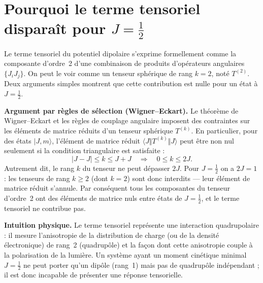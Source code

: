 \chapter[Moment tensoriel pour J=1/2]{Pourquoi le terme tensoriel disparaît pour $J=\tfrac12$}

\label{annex:no_tensor}

Le terme tensoriel du potentiel dipolaire s'exprime formellement comme la composante d'ordre~2 d'une combinaison de produits d'opérateurs angulaires \(\{J_iJ_j\}\). On peut le voir comme un tenseur sphérique de rang \(k=2\), noté \(T^{(2)}\). Deux arguments simples montrent que cette contribution est nulle pour un état à \(J=\tfrac12\).

\medskip

\noindent\textbf{Argument par règles de sélection (Wigner–Eckart).}
Le théorème de Wigner–Eckart et les règles de couplage angulaire imposent des contraintes sur les éléments de matrice réduits d'un tenseur sphérique \(T^{(k)}\). En particulier, pour des états \(|J,m\rangle\), l'élément de matrice réduit \(\langle J\Vert T^{(k)}\Vert J\rangle\) peut être non nul seulement si la condition triangulaire est satisfaite :
\[
|J-J|\le k \le J+J \quad\Longrightarrow\quad 0\le k\le 2J.
\]
Autrement dit, le rang \(k\) du tenseur ne peut dépasser \(2J\). Pour \(J=\tfrac12\) on a \(2J=1\) : les tenseurs de rang \(k\ge2\) (dont \(k=2\)) sont donc interdits — leur élément de matrice réduit s'annule. Par conséquent tous les composantes du tenseur d'ordre~2 ont des éléments de matrice nuls entre états de \(J=\tfrac12\), et le terme tensoriel ne contribue pas.

\medskip

\noindent\textbf{Intuition physique.}
Le terme tensoriel représente une interaction quadrupolaire : il mesure l'anisotropie de la distribution de charge (ou de la densité électronique) de rang~2 (quadrupôle) et la façon dont cette anisotropie couple à la polarisation de la lumière. Un système ayant un moment cinétique minimal \(J=\tfrac12\) ne peut porter qu'un dipôle (rang~1) mais pas de quadrupôle indépendant ; il est donc incapable de présenter une réponse tensorielle.

\medskip

